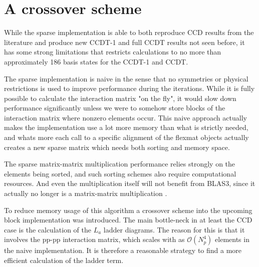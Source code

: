 \FloatBarrier

\section{A crossover scheme}

While the sparse implementation is able to both reproduce CCD results
from the literature and produce new CCDT-1 and full CCDT results not
seen before, it has some strong limitations that restricts
calculations to no more than approximately 186 basis states for the
CCDT-1 and CCDT.

The sparse implementation is naive in the sense that no symmetries or
physical restrictions is used to improve performance during the
iterations. While it is fully possible to calculate the interaction
matrix "on the fly", it would slow down performance significantly
unless we were to somehow store blocks of the interaction matrix where
nonzero elements occur. This naive approach actually makes the
implementation use a lot more memory than what is strictly needed, and
whats more each call to a specific alignment of the flexmat objects
actually creates a new sparse matrix which needs both sorting and
memory space.

The sparse matrix-matrix multiplication performance relies strongly on
the elements being sorted, and such sorting schemes also require
computational resources. And even the multiplication itself will not
benefit from BLAS3, since it actually no longer is a matrix-matrix
multiplication \cite{Karniadakis}.

To reduce memory usage of this algorithm a crossover scheme into the
upcoming block implementation was introduced. The main bottle-neck in
at least the CCD case is the calculation of the $L_a$ ladder
diagrams. The reason for this is that it involves the pp-pp
interaction matrix, which scales with as $\mathcal{O}(N_p^4)$ elements
in the naive implementation. It is therefore a reasonable strategy to
find a more efficient calculation of the ladder term.

